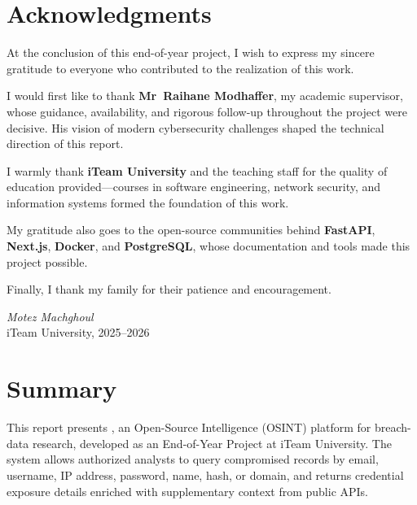 \chapter*{Acknowledgments}

At the conclusion of this end-of-year project, I wish to express my sincere
gratitude to everyone who contributed to the realization of this work.

I would first like to thank \textbf{Mr~Raihane Modhaffer}, my academic
supervisor, whose guidance, availability, and rigorous follow-up throughout
the project were decisive. His vision of modern cybersecurity challenges
shaped the technical direction of this report.

I warmly thank \textbf{iTeam University} and the teaching staff for the
quality of education provided---courses in software engineering, network
security, and information systems formed the foundation of this work.

My gratitude also goes to the open-source communities behind
\textbf{FastAPI}, \textbf{Next.js}, \textbf{Docker}, and \textbf{PostgreSQL},
whose documentation and tools made this project possible.

Finally, I thank my family for their patience and encouragement.

\vspace{1cm}
\noindent\textit{Motez Machghoul}\\
iTeam University, 2025--2026

\clearpage

\chapter*{Summary}

This report presents \leaklens{}, an Open-Source Intelligence (OSINT)
platform for breach-data research, developed as an End-of-Year Project at
iTeam University. The system allows authorized analysts to query compromised
records by email, username, IP address, password, name, hash, or domain, and
returns credential exposure details enriched with supplementary context from
public APIs.


